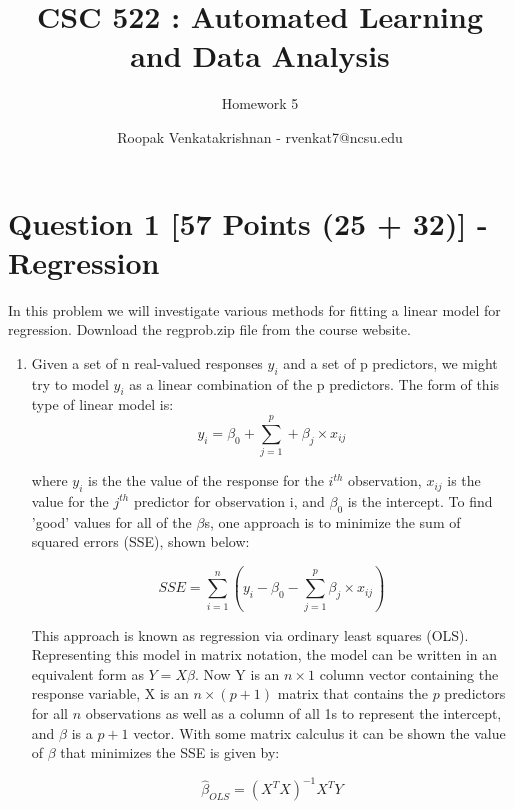 \documentclass[fontsize=10pt,DIV=14]{scrartcl}
\begin{document}
	\title{CSC 522 : Automated Learning and Data Analysis}
	\subtitle{Homework 5}
	\author{Roopak Venkatakrishnan - rvenkat7@ncsu.edu}
	\maketitle

	\section{Question 1 [57 Points (25 + 32)] - Regression}

	In this problem we will investigate various methods for ﬁtting a linear model for regression. Download the regprob.zip ﬁle from the course website.

	\begin{enumerate}
		\item
		Given a set of n real-valued responses $y_{i}$ and a set of p predictors, we might try to model $y_{i}$ as a linear combination of the p predictors. The form of this type of linear model is:
		\begin{equation*}
			y_{i} = \beta_{0} +\sum_{j=1}^{p} + \beta_{j} \times x_{ij}
		\end{equation*}

		where $y_{i}$ is the the value of the response for the $i^{th}$ observation, $x_{ij}$ is the value for the $j^{th}$ predictor for observation i, and $\beta_{0}$ is the intercept. To ﬁnd ’good’ values for all of the $\beta$s, one approach is to minimize the sum of squared errors (SSE), shown below:

		\begin{equation*}
			SSE =\sum_{i=1}^{n} (y_{i} - \beta_{0} - \sum_{j=1}^{p} \beta_{j} \times x_{ij})
		\end{equation*}

		This approach is known as regression via ordinary least squares (OLS). Representing this model in matrix notation, the model can be written in an equivalent form as $Y = X\beta$. Now Y is an $n \times 1$ column vector containing the response variable, X is an $n \times (p + 1)$ matrix that contains the $p$ predictors for all $n$ observations as well as a column of all 1s to represent the intercept, and $\beta$ is a $p + 1$ vector. With some matrix calculus it can be shown the value of $\beta$ that minimizes the SSE is given by:

		\begin{equation*}
			\hat{\beta}_{OLS} = (X^{T} X)^{-1} X^{T}Y
		\end{equation*}


\end{enumerate}
\end{document}
